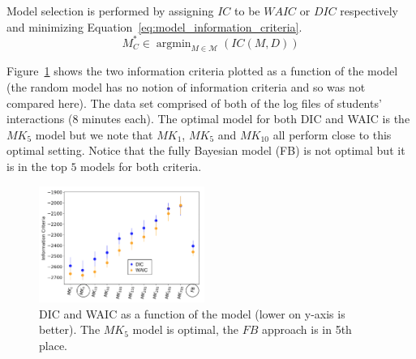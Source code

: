 \documentclass[letterpaper]{article} %
\DeclareMathOperator{\argmin}{argmin}
\begin{document}
Model selection is performed by assigning $IC$ to be $WAIC$ or $DIC$ respectively and minimizing Equation~\ref{eq:model_information_criteria}.
\begin{equation}
    \label{eq:model_information_criteria}
    M^*_C \in \argmin_{M \in \mathcal{M}}(IC(M, D))
\end{equation}

Figure~\ref{fig:dic_waic_scores} shows the two information criteria plotted as a function of the model (the random model has no notion of information criteria and so was not compared here). The data set comprised of both of the log files of students' interactions (8 minutes each). The optimal model for both DIC and WAIC is the $MK_{5}$ model but we note that $MK_{1}$, $MK_{5}$ and $MK_{10}$ all perform close to this optimal setting. Notice that the fully Bayesian model (FB) is not optimal but it is in the top $5$ models for both criteria.
\begin{figure}[t]
\centering
\includegraphics[width=0.48\textwidth]{images/dic_waic_scores.png}
\caption{DIC and WAIC as a function of the model (lower on y-axis is better). The $MK_5$ model is optimal, the $FB$ approach is in 5th place.}
\label{fig:dic_waic_scores}
\end{figure}
\end{document}
